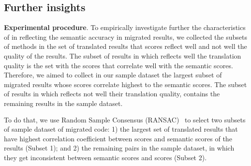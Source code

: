 \subsection{Further insights}
\textbf{Experimental procedure}. To empirically investigate further
the characteristics of {\model} in reflecting the semantic accuracy in
migrated results, we collected the subsets of methods in the set of
translated results that {\model} scores reflect well and not well the
quality of the results. The subset of results in which {\model}
reflects well the translation quality is the set with the {\model}
scores that correlate well with the semantic scores. 
%
Therefore, we aimed to collect in our sample dataset the largest
subset of migrated results whose {\model} scores correlate highest to
the semantic scores. The subset of results in which {\model} reflects
not well their translation quality, contains the remaining results in
the sample dataset.


%


To do that, we use Random Sample Consensus
(RANSAC)~\cite{Fischler:1981:RSC:358669.358692} to select two subsets
of sample dataset of migrated code: 1) the largest set of translated
results that have highest correlation coefficient between {\model}
scores and semantic scores of the results (Subset 1); and 2) the
remaining pairs in the sample dataset, in which they get inconsistent
between semantic scores and {\model} scores (Subset 2).

